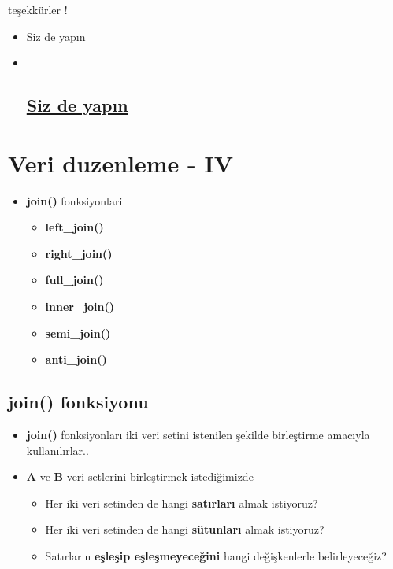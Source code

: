 \documentclass[
  oneside]{book}
\providecommand{\tightlist}{%
  \setlength{\itemsep}{0pt}\setlength{\parskip}{0pt}}
\begin{document}
teşekkürler !

\begin{itemize}
\item
  \href{https://learnr-examples.shinyapps.io/ex-data-filter/\#section-welcome\%3E}{Siz de yapın}
\item ~
  \hypertarget{siz-de-yapux131n}{%
  \section{\texorpdfstring{\href{https://learnr-examples.shinyapps.io/ex-data-summarise/}{Siz de yapın}}{Siz de yapın}}\label{siz-de-yapux131n}}
\end{itemize}

\hypertarget{veri-duzenleme---iv}{%
\chapter{Veri duzenleme - IV}\label{veri-duzenleme---iv}}

\begin{itemize}
\tightlist
\item
  \textbf{join()} fonksiyonlari

  \begin{itemize}
  \tightlist
  \item
    \textbf{left\_join()}
  \item
    \textbf{right\_join()}
  \item
    \textbf{full\_join()}
  \item
    \textbf{inner\_join()}
  \item
    \textbf{semi\_join()}
  \item
    \textbf{anti\_join()}
  \end{itemize}
\end{itemize}

\hypertarget{join-fonksiyonu}{%
\section{\texorpdfstring{\textbf{join()} fonksiyonu}{join() fonksiyonu}}\label{join-fonksiyonu}}

\begin{itemize}
\item
  \textbf{join()} fonksiyonları iki veri setini istenilen şekilde birleştirme amacıyla kullanılırlar..
\item
  \textbf{A} ve \textbf{B} veri setlerini birleştirmek istediğimizde

  \begin{itemize}
  \item
    Her iki veri setinden de hangi \textbf{satırları} almak istiyoruz?
  \item
    Her iki veri setinden de hangi \textbf{sütunları} almak istiyoruz?
  \item
    Satırların \textbf{eşleşip eşleşmeyeceğini} hangi değişkenlerle belirleyeceğiz?
  \end{itemize}
\end{itemize}
\end{document}
